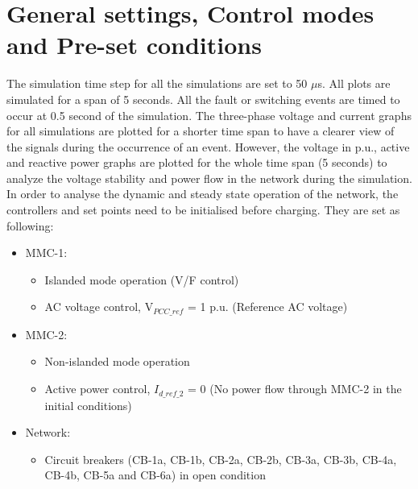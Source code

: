 \section{General settings, Control modes and Pre-set conditions}
The simulation time step for all the simulations are set to 50 $\mu$s. All plots are simulated for a span of 5 seconds. All the fault or switching events are timed to occur at 0.5 second of the simulation. The three-phase voltage and current graphs for all simulations are plotted for a shorter time span to have a clearer view of the signals during the occurrence of an event. However, the voltage in p.u., active and reactive power graphs are plotted for the whole time span (5 seconds) to analyze the voltage stability and power flow in the network during the simulation. In order to analyse the dynamic and steady state operation of the network, the controllers and set points need to be initialised before charging. They are set as following:

\begin{itemize}
    \item \gls{MMC}-1:
    \begin{itemize}
        \item Islanded mode operation (V/F control)
        \item \gls{AC} voltage control, V$_{PCC\_{ref}}$ = 1 p.u. (Reference \gls{AC} voltage)
    \end{itemize}
\end{itemize}

\begin{itemize}
    \item \gls{MMC}-2:
    \begin{itemize}
        \item Non-islanded mode operation
        \item Active power control, $I_{d\_ref\_2}$ = 0 (No power flow through \gls{MMC}-2 in the initial conditions)
    \end{itemize}
\end{itemize}

\begin{itemize}
    \item Network:
    \begin{itemize}
        \item Circuit breakers (CB-1a, CB-1b, CB-2a, CB-2b, CB-3a, CB-3b, CB-4a, CB-4b, CB-5a and CB-6a) in open condition
    \end{itemize}
\end{itemize}

